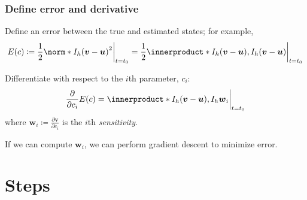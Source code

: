 \documentclass{beamer}
\newcommand{\bu}{\boldsymbol u}
\newcommand{\bv}{\boldsymbol v}
\newcommand{\bw}{\boldsymbol w}
\begin{document}
\begin{frame}
  \frametitle{Define error and derivative}
  Define an error between the true and estimated states; for example,
  \begin{equation*}
    E(c) \coloneq \frac12 \norm*{I_h(\bv - \bu)}^2 \bigg \lvert_{t=t_0}
    = \frac12 \innerproduct*{I_h(\bv - \bu), I_h(\bv - \bu)} \bigg \lvert_{t=t_0}
  \end{equation*}
  \pause

  Differentiate with respect to the $i$th parameter, $c_i$:
  \begin{equation*}
    \frac{\partial}{\partial c_i} E(c) = \innerproduct*{I_h(\bv - \bu),
    I_h \bw_i} \bigg \lvert_{t=t_0}
  \end{equation*}
  where $\bw_i \coloneq \frac{\partial \bv}{\partial c_i}$ is the $i$th
  \textit{sensitivity}.
  \newline
  \pause

  If we can compute $\bw_i$, we can perform gradient descent to minimize error.
\end{frame}


\section{Steps}
\end{document}
